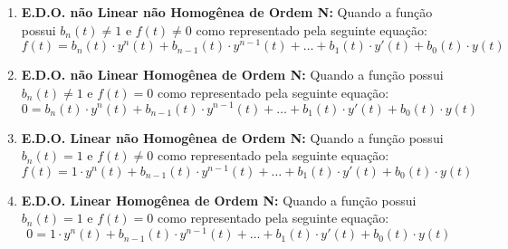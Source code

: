 \documentclass{article}
\begin{document}
            \begin{enumerate}[rightmargin = \leftmargin]
                \item \textbf{E.D.O. não Linear não Homogênea de Ordem N:} Quando a função possui $b_{n}(t) \neq 1$ e $f(t) \neq 0$ como representado pela seguinte equação:
                    \begin{equation*}
                        f(t) = 
                        b_{n}(t)   \cdot y^{n}(t) + 
                        b_{n-1}(t) \cdot y^{n-1}(t) + \dots +
                        b_{1}(t) \cdot y'(t) + 
                        b_{0}(t) \cdot y(t)
                    \end{equation*}

                \item \textbf{E.D.O. não Linear Homogênea de Ordem N:} Quando a função possui $b_{n}(t) \neq 1$ e $f(t) = 0$ como representado pela seguinte equação:
                    \begin{equation*}
                        0 = 
                        b_{n}(t)   \cdot y^{n}(t) + 
                        b_{n-1}(t) \cdot y^{n-1}(t) + \dots +
                        b_{1}(t) \cdot y'(t) + 
                        b_{0}(t) \cdot y(t)
                    \end{equation*}

                \item \textbf{E.D.O. Linear não Homogênea de Ordem N:} Quando a função possui $b_{n}(t) = 1$ e $f(t) \neq 0$ como representado pela seguinte equação:
                    \begin{equation*}
                        f(t) = 
                        1          \cdot y^{n}(t) + 
                        b_{n-1}(t) \cdot y^{n-1}(t) + \dots +
                        b_{1}(t) \cdot y'(t) + 
                        b_{0}(t) \cdot y(t)
                    \end{equation*}

                \item \textbf{E.D.O. Linear Homogênea de Ordem N:} Quando a função possui $b_{n}(t) = 1$ e $f(t) = 0$ como representado pela seguinte equação:
                    \begin{equation*}
                        0 = 
                        1          \cdot y^{n}(t) + 
                        b_{n-1}(t) \cdot y^{n-1}(t) + \dots +
                        b_{1}(t) \cdot y'(t) + 
                        b_{0}(t) \cdot y(t)
                    \end{equation*}
            \end{enumerate}
\end{document}
